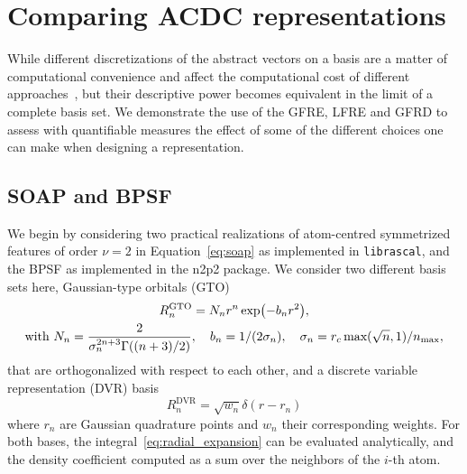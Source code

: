 \section{Comparing ACDC representations}

While different discretizations of the abstract vectors on a basis  are a matter of computational convenience and affect the computational cost of different approaches~\cite{zuo+20jpcl}, but their descriptive power becomes equivalent in the limit of a complete basis set. 
We demonstrate the use of the GFRE, LFRE and GFRD to assess with quantifiable measures the effect of some of the different choices one can make when designing a representation.

\subsection{SOAP and BPSF}
\label{sub:hypers}
We begin by considering two practical realizations of atom-centred symmetrized features of order $\nu=2$ in Equation~\eqref{eq:soap} as implemented in \texttt{librascal}\cite{LIBRASCAL}, and the BPSF\cite{behl11jcp} as implemented in the n2p2 package\cite{singraber2019parallel}. 
We consider two different basis sets here, Gaussian-type orbitals (GTO)
\begin{subequations}
\begin{gather}
  R_n^\textrm{GTO} = N_n r^{n}\exp(-b_nr^2),\\
\text{with }N_n=\frac2{\sigma_n^{2n+3}\Gamma((n+3)/2)},\quad b_n = 1/(2\sigma_n),\quad \sigma_n = r_c\,\textrm{max}(\sqrt{n},1)/n_\mathrm{max},
\end{gather}
\end{subequations}
that are orthogonalized with respect to each other,
and a discrete variable representation (DVR) basis
\begin{equation}
R_n^\textrm{DVR}= \sqrt{w_n}\delta(r-r_n)
\end{equation}
where $r_n$ are Gaussian quadrature points and $w_n$ their corresponding weights.
For both bases, the integral~\eqref{eq:radial_expansion} can be evaluated analytically, and the density coefficient computed as a sum over the neighbors of the $i$-th atom.


